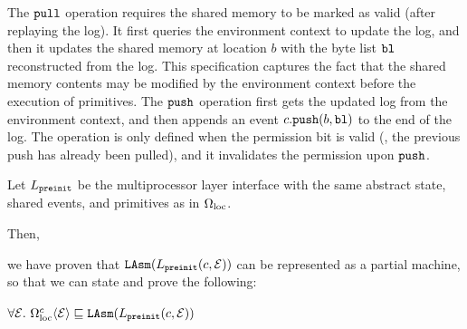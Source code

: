 The ${\texttt{pull}}$ operation requires the shared memory to be marked as valid
(after replaying the log). It first queries the environment context to update
the log, and then it updates the shared memory at location $b$ with the byte
list ${\texttt{bl}}$ reconstructed from the log. This specification
captures the fact that the shared memory contents may be
modified by the environment context before the execution of
primitives. 
The ${\texttt{push}}$ operation first gets the updated log from the environment context,
and then appends an event $c.{\texttt{push}}(b,{\texttt{bl}})$ to the end of the log.
The operation is only defined when the permission bit is valid (\ie, the previous push
has already been pulled), and it invalidates the permission upon ${\texttt{push}}$.

Let $L_{\texttt{preinit}}$ be the multiprocessor layer interface with the same abstract state, shared events, and primitives as in $\Omega_{\text{loc}}$.
Then, we
have proven that ${\texttt{LAsm}}(L_{\texttt{preinit}}(c, \mathcal{E}))$ can be represented as a
partial machine, so that we can state and prove the following:
 \begin{lemma}
$ \forall \mathcal{E}.\ \Omega_{\text{loc}}^c\langle \mathcal{E} \rangle \sqsubseteq {\texttt{LAsm}}(L_{\texttt{preinit}}(c, \mathcal{E})) $
 \end{lemma}

